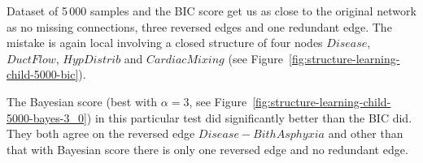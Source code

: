 \documentclass[english,cover]{fitthesis} %
\newcommand{\ignore}[1]{}                  %
\begin{document}
Dataset of 5\,000 samples and the BIC score get us as close to the original network as no missing connections, three reversed edges and one redundant edge. The mistake is again local involving a closed structure of four nodes $Disease$, $DuctFlow$, $HypDistrib$ and $CardiacMixing$ (see Figure~\ref{fig:structure-learning-child-5000-bic}). 

The Bayesian score (best with $\alpha=3$, see Figure~\ref{fig:structure-learning-child-5000-bayes-3_0}) in this particular test did significantly better than the BIC did. They both agree on the reversed edge $Disease - BithAsphyxia$ and other than that with Bayesian score there is only one reversed edge and no redundant edge.

\ignore{Bayes performance: $(\alpha=1, x, x, x)$, $(\alpha=1.5, x, x, x)$, $(\alpha=2, x, x, x)$, $(\alpha=2.5, x, x, x)$, $(\alpha=3, x, x, x)$, $(\alpha=3.5, x, x, x)$, $(\alpha=4, x, x, x)$, $(\alpha=5, x, x, x)$}
\end{document}
